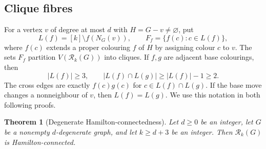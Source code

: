 \documentclass[11pt]{article}
\newtheorem{theorem}{Theorem}[section]
\theoremstyle{remark}
\newcommand{\Rk}{\mathcal R_k}
\numberwithin{equation}{section}
\numberwithin{table}{section}
\begin{document}
\subsection{Clique fibres}
For a vertex $v$ of degree at most $d$ with $H=G-v\ne\varnothing$, put
\[
 L(f)=[k]\setminus f(N_G(v)),\qquad
 F_f=\{f(c):c\in L(f)\},
\]
where $f(c)$ extends a proper colouring $f$ of $H$ by assigning colour
$c$ to $v$. The sets $F_f$ partition $V(\Rk(G))$ into cliques. If
$f,g$ are adjacent base colourings, then
\begin{equation}\label{eq:clique-fibres}
 |L(f)|\ge3,\qquad |L(f)\cap L(g)|\ge |L(f)|-1\ge2.
\end{equation}
The cross edges are exactly $f(c)g(c)$ for $c\in L(f)\cap L(g)$.
If the base move changes a nonneighbour of $v$, then $L(f)=L(g)$.
We use this notation in both following proofs.

\begin{theorem}[Degenerate Hamilton-connectedness]\label{thm:degenerate-hc}
Let $d\ge0$ be an integer, let $G$ be a nonempty $d$-degenerate graph,
and let $k\ge d+3$ be an integer. Then $\Rk(G)$ is
Hamilton-connected.
\end{theorem}
\end{document}
